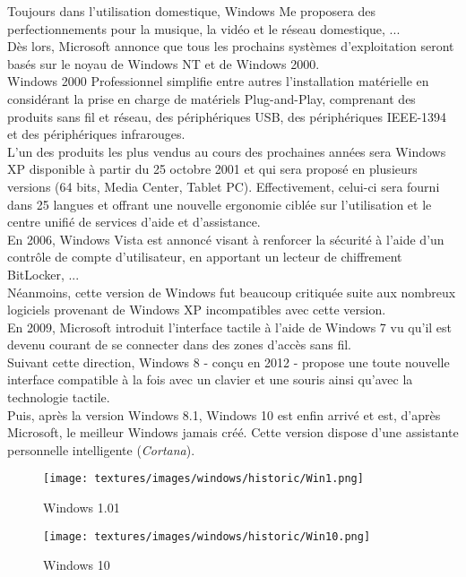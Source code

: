 Toujours dans l'utilisation domestique, Windows Me proposera des \\
perfectionnements pour la musique, la vidéo et le réseau domestique, ... \\

Dès lors, Microsoft annonce que tous les prochains systèmes d'exploitation
seront basés sur le noyau de Windows NT et de Windows 2000. \\

Windows 2000 Professionnel simplifie entre autres l'installation matérielle en
considérant la prise en charge de matériels Plug-and-Play, comprenant des
produits sans fil et réseau, des périphériques USB, des périphériques IEEE-1394
et des périphériques infrarouges. \\

L'un des produits les plus vendus au cours des prochaines années sera Windows
XP disponible à partir du 25 octobre 2001 et qui sera proposé en plusieurs
versions (64 bits, Media Center, Tablet PC). Effectivement, celui-ci sera
fourni dans 25 langues et offrant une nouvelle ergonomie ciblée sur
l'utilisation et le centre unifié de services d'aide et d'assistance. \\

En 2006, Windows Vista est annoncé visant à renforcer la sécurité à l'aide d'un
contrôle de compte d'utilisateur, en apportant un lecteur de chiffrement
BitLocker, ... \\

Néanmoins, cette version de Windows fut beaucoup critiquée suite aux nombreux
logiciels provenant de Windows XP incompatibles avec cette version. \\

En 2009, Microsoft introduit l'interface tactile à l'aide de Windows 7 vu qu'il
est devenu courant de se connecter dans des zones d'accès sans fil. \\

Suivant cette direction, Windows 8 - conçu en 2012 - propose une toute nouvelle
interface compatible à la fois avec un clavier et une souris ainsi qu'avec la
technologie tactile. \\

Puis, après la version Windows 8.1, Windows 10 est enfin arrivé et est, d'après
Microsoft, le meilleur Windows jamais créé. Cette version dispose d'une
assistante personnelle intelligente (\textit{Cortana}). \\

\begin{figure}[!htb] 
  \texttt{[image: textures/images/windows/historic/Win1.png]}
  \caption{Windows 1.01}\label{fig:Windows 1.01}
	\endminipage\hfill {}
  \texttt{[image: textures/images/windows/historic/Win10.png]}
  \caption{Windows 10}\label{fig:Windows 10}
	\endminipage
\end{figure}

